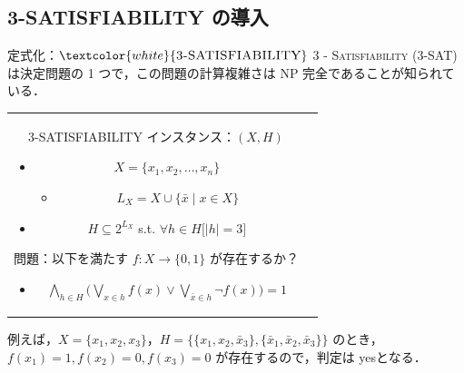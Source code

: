\documentclass[dvipdfmx]{beamer}
\begin{document}
\subsection{\textsc{3-SATISFIABILITY} の導入}
\begin{frame}{定式化：${\textcolor{white}{\mbox {\sc 3-SATISFIABILITY}}}$}
  \textsc{3 - Satisfiability (3-SAT) } は決定問題の 1 つで，この問題の計算複雑さは NP  完全であることが知られている．
  \begin{tabular}{cc}
    \begin{minipage}[]{0.7\hsize}
      \begin{block}{\textsc{3-SATISFIABILITY}}
        インスタンス：$(X,H)$
        \begin{itemize}
          \item $X=\{x_1,x_2,\dots ,x_n\}$
          \begin{itemize}
            \item $L_X = X \cup \{\bar x \mid x \in X\}$
          \end{itemize}
          \item $H \subseteq 2^{L_X}$ s.t. $\forall h \in H \big[|h| = 3\big]$
        \end{itemize}
        問題：以下を満たす $f : X \to \{0,1\}$ が存在するか？
        \begin{itemize}
          \item $\displaystyle \bigwedge_{h \in H} \bigg(\bigvee_{x \in h}f(x) \lor \bigvee_{\bar x \in h}\lnot f(x) \bigg) = 1$
        \end{itemize}
      \end{block}
    \end{minipage}
    \begin{minipage}[c]{0.3\hsize}
    \end{minipage}
    \vspace{3mm}
  \end{tabular}

  例えば，$X = \{x_1,x_2,x_3\}$，$H = \big\{ \{x_1, x_2, \bar x_3\}, \{\bar x_1, \bar x_2,\bar x_3\}\big\}$ のとき，
  $f(x_1) = 1, f(x_2) = 0, f(x_3) = 0$ が存在するので，判定は yesとなる．
\end{frame}
\end{document}
